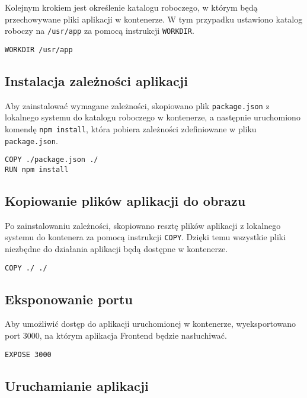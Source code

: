 Kolejnym krokiem jest określenie katalogu roboczego, w którym będą przechowywane pliki aplikacji w kontenerze. W tym przypadku ustawiono katalog roboczy na \texttt{/usr/app} za pomocą instrukcji \texttt{WORKDIR}.

\begin{verbatim}
WORKDIR /usr/app
\end{verbatim}

\subsection{Instalacja zależności aplikacji}

Aby zainstalować wymagane zależności, skopiowano plik \texttt{package.json} z lokalnego systemu do katalogu roboczego w kontenerze, a następnie uruchomiono komendę \texttt{npm install}, która pobiera zależności zdefiniowane w pliku \texttt{package.json}.

\begin{verbatim}
COPY ./package.json ./
RUN npm install
\end{verbatim}

\subsection{Kopiowanie plików aplikacji do obrazu}

Po zainstalowaniu zależności, skopiowano resztę plików aplikacji z lokalnego systemu do kontenera za pomocą instrukcji \texttt{COPY}. Dzięki temu wszystkie pliki niezbędne do działania aplikacji będą dostępne w kontenerze.

\begin{verbatim}
COPY ./ ./
\end{verbatim}

\subsection{Eksponowanie portu}

Aby umożliwić dostęp do aplikacji uruchomionej w kontenerze, wyeksportowano port 3000, na którym aplikacja Frontend będzie nasłuchiwać.

\begin{verbatim}
EXPOSE 3000
\end{verbatim}

\subsection{Uruchamianie aplikacji}

